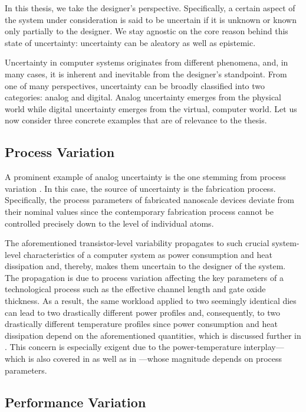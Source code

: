 In this thesis, we take the designer's perspective. Specifically, a certain
aspect of the system under consideration is said to be uncertain if it is
unknown or known only partially to the designer. We stay agnostic on the core
reason behind this state of uncertainty: uncertainty can be aleatory as well as
epistemic.

Uncertainty in computer systems originates from different phenomena, and, in
many cases, it is inherent and inevitable from the designer's standpoint. From
one of many perspectives, uncertainty can be broadly classified into two
categories: analog and digital. Analog uncertainty emerges from the physical
world while digital uncertainty emerges from the virtual, computer world. Let us
now consider three concrete examples that are of relevance to the thesis.

\subsection{Process Variation}

A prominent example of analog uncertainty is the one stemming from process
variation \cite{chandrakasan2000, srivastava2010}. In this case, the source of
uncertainty is the fabrication process. Specifically, the process parameters of
fabricated nanoscale devices deviate from their nominal values since the
contemporary fabrication process cannot be controlled precisely down to the
level of individual atoms.

The aforementioned transistor-level variability propagates to such crucial
system-level characteristics of a computer system as power consumption and heat
dissipation and, thereby, makes them uncertain to the designer of the system.
The propagation is due to process variation affecting the key parameters of a
technological process such as the effective channel length and gate oxide
thickness. As a result, the same workload applied to two seemingly identical
dies can lead to two drastically different power profiles and, consequently, to
two drastically different temperature profiles since power consumption and heat
dissipation depend on the aforementioned quantities, which is discussed further
in . This concern is especially exigent due to the
power-temperature interplay---which is also covered in  as
well as in ---whose magnitude depends on
process parameters.

\subsection{Performance Variation}


